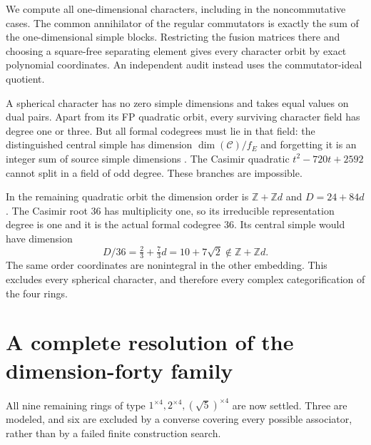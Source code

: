 \documentclass[11pt]{article}
\begin{document}
We compute all one-dimensional characters, including in the noncommutative cases.
The common annihilator of the regular commutators is exactly the sum of the
one-dimensional simple blocks. Restricting the fusion matrices there and choosing
a square-free separating element gives every character orbit by exact polynomial
coordinates. An independent audit instead uses the commutator-ideal quotient.

A spherical character has no zero simple dimensions and takes equal values on
dual pairs. Apart from its FP quadratic orbit, every surviving character field has
degree one or three. But all formal codegrees must lie in that field: the
distinguished central simple has dimension $\dim(\mathcal C)/f_E$ and forgetting it
is an integer sum of source simple dimensions \cite{Ostrik}. The Casimir quadratic
$t^2-720t+2592$ cannot split in a field of odd degree. These branches are impossible.

In the remaining quadratic orbit the dimension order is $\mathbb Z+\mathbb Z d$
and $D=24+84d$. The Casimir root 36 has multiplicity one, so its irreducible
representation degree is one and it is the actual formal codegree 36. Its central
simple would have dimension
\[
 D/36=\tfrac23+\tfrac73d=10+7\sqrt2\notin\mathbb Z+\mathbb Z d.
\]
The same order coordinates are nonintegral in the other embedding. This excludes
every spherical character, and therefore every complex categorification of the four rings.

\section{A complete resolution of the dimension-forty family}
All nine remaining rings of type $1^{\times4},2^{\times4},(\sqrt5)^{\times4}$
are now settled. Three are modeled, and six are excluded by a converse covering
every possible associator, rather than by a failed finite construction search.
\end{document}
